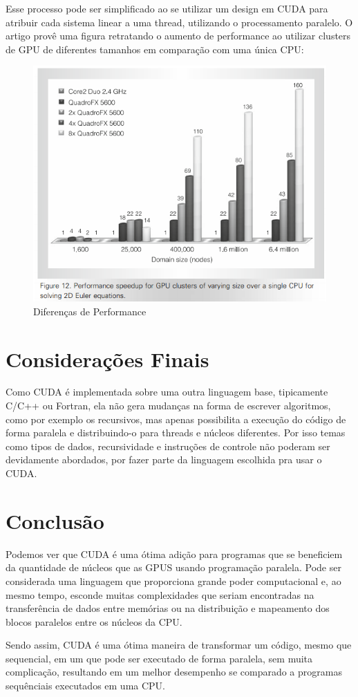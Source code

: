 \documentclass[12pt]{article}
\begin{document}
Esse processo pode ser simplificado ao se  utilizar  um design em CUDA para atribuir  cada sistema linear a uma thread, utilizando o processamento paralelo. O artigo \cite{CUDAartigo1} provê uma figura retratando o aumento de performance ao utilizar clusters de GPU de diferentes tamanhos em comparação com uma única CPU:
\begin{figure}[H]
\centering
\includegraphics[width=.5\textwidth]{example1CUDA.png}
\caption{Diferenças de Performance}
\label{fig:figura7}
\end{figure}

\section{Considerações Finais}
Como CUDA é implementada sobre uma outra linguagem base, tipicamente C/C++ ou Fortran, ela não gera mudanças na forma de escrever algoritmos, como por exemplo os recursivos, mas apenas possibilita a execução do código de forma paralela e distribuindo-o para threads e núcleos diferentes. Por isso temas como tipos de dados, recursividade e instruções de controle não poderam ser devidamente abordados, por fazer parte da linguagem escolhida pra usar o CUDA.

\section{Conclusão}
Podemos ver que CUDA é uma ótima adição para programas que se beneficiem da quantidade de núcleos que as GPUS usando programação paralela. Pode ser considerada uma linguagem que proporciona grande poder computacional e, ao mesmo tempo, esconde muitas complexidades que seriam encontradas na transferência de dados entre memórias ou na distribuição e mapeamento dos blocos paralelos entre os núcleos da CPU. 

Sendo assim, CUDA é uma ótima maneira de transformar um código, mesmo que sequencial, em um que pode ser executado de forma paralela, sem muita complicação, resultando em um melhor desempenho se comparado a programas sequênciais executados em uma CPU.


\end{document}
